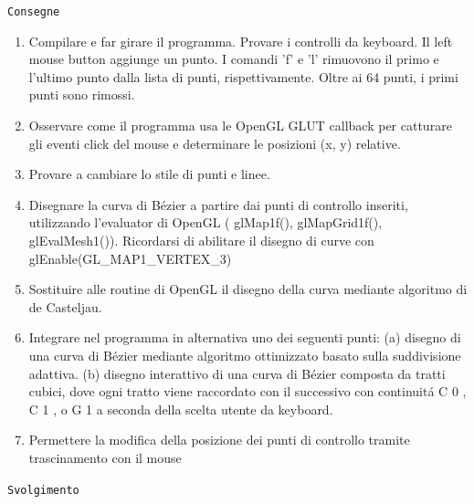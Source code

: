 \texttt{Consegne}
\begin{enumerate}
    \item Compilare e far girare il programma. Provare i controlli da keyboard. Il left mouse button aggiunge
un punto. I comandi 'f' e 'l' rimuovono il primo e l’ultimo punto dalla lista di punti, rispettivamente.
Oltre ai 64 punti, i primi punti sono rimossi.
    \item Osservare come il programma usa le OpenGL GLUT callback per catturare gli eventi click del
mouse e determinare le posizioni (x, y) relative.
    \item Provare a cambiare lo stile di punti e linee.
    \item Disegnare la curva di Bézier a partire dai punti di controllo inseriti, utilizzando l’evaluator di
OpenGL ( glMap1f(), glMapGrid1f(), glEvalMesh1()). Ricordarsi di abilitare il disegno di curve con glEnable(GL\_MAP1\_VERTEX\_3)
    \item Sostituire alle routine di OpenGL il disegno della curva mediante algoritmo di de Casteljau.
    \item Integrare nel programma in alternativa uno dei seguenti punti:
(a) disegno di una curva di Bézier mediante algoritmo ottimizzato basato sulla suddivisione adattiva.
(b) disegno interattivo di una curva di Bézier composta da tratti cubici, dove ogni tratto viene
raccordato con il successivo con continuitá C 0 , C 1 , o G 1 a seconda della scelta utente da
keyboard.
    \item Permettere la modifica della posizione dei punti di controllo tramite trascinamento con il mouse
\end{enumerate}
 \texttt{Svolgimento}
